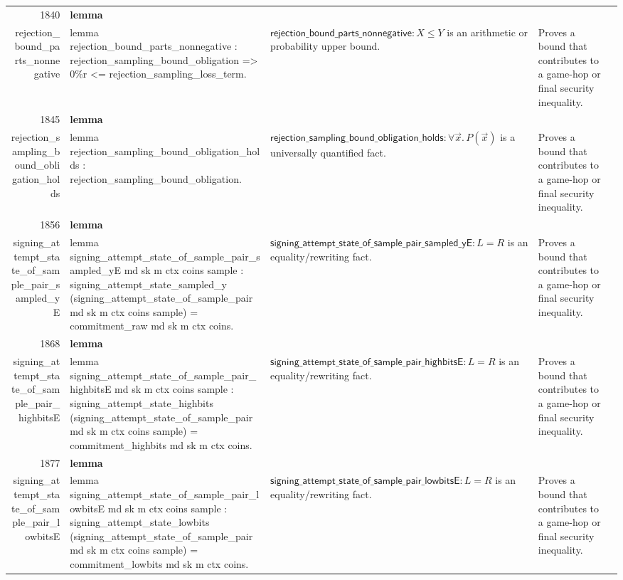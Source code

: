 \documentclass[10pt]{article}
\newcommand{\ec}[1]{\begingroup\ttfamily\scriptsize #1\endgroup}
\begin{document}
\begin{longtable}{r L{0.17\textwidth} L{0.26\textwidth} L{0.27\textwidth} L{0.20\textwidth}}
1840 & \textbf{lemma}\\\ec{rejection\_bound\_parts\_nonnegative} & \ec{lemma rejection\_bound\_parts\_nonnegative : rejection\_sampling\_bound\_obligation => 0\%r <= rejection\_sampling\_loss\_term.} & \(\mathsf{rejection\_bound\_parts\_nonnegative} : X \le Y\) is an arithmetic or probability upper bound. & Proves a bound that contributes to a game-hop or final security inequality. \\
1845 & \textbf{lemma}\\\ec{rejection\_sampling\_bound\_obligation\_holds} & \ec{lemma rejection\_sampling\_bound\_obligation\_holds : rejection\_sampling\_bound\_obligation.} & \(\mathsf{rejection\_sampling\_bound\_obligation\_holds} : \forall \vec{x}.\, P(\vec{x})\) is a universally quantified fact. & Proves a bound that contributes to a game-hop or final security inequality. \\
1856 & \textbf{lemma}\\\ec{signing\_attempt\_state\_of\_sample\_pair\_sampled\_yE} & \ec{lemma signing\_attempt\_state\_of\_sample\_pair\_sampled\_yE md sk m ctx coins sample : signing\_attempt\_state\_sampled\_y (signing\_attempt\_state\_of\_sample\_pair md sk m ctx coins sample) = commitment\_raw md sk m ctx coins.} & \(\mathsf{signing\_attempt\_state\_of\_sample\_pair\_sampled\_yE} : L = R\) is an equality/rewriting fact. & Proves a bound that contributes to a game-hop or final security inequality. \\
1868 & \textbf{lemma}\\\ec{signing\_attempt\_state\_of\_sample\_pair\_highbitsE} & \ec{lemma signing\_attempt\_state\_of\_sample\_pair\_highbitsE md sk m ctx coins sample : signing\_attempt\_state\_highbits (signing\_attempt\_state\_of\_sample\_pair md sk m ctx coins sample) = commitment\_highbits md sk m ctx coins.} & \(\mathsf{signing\_attempt\_state\_of\_sample\_pair\_highbitsE} : L = R\) is an equality/rewriting fact. & Proves a bound that contributes to a game-hop or final security inequality. \\
1877 & \textbf{lemma}\\\ec{signing\_attempt\_state\_of\_sample\_pair\_lowbitsE} & \ec{lemma signing\_attempt\_state\_of\_sample\_pair\_lowbitsE md sk m ctx coins sample : signing\_attempt\_state\_lowbits (signing\_attempt\_state\_of\_sample\_pair md sk m ctx coins sample) = commitment\_lowbits md sk m ctx coins.} & \(\mathsf{signing\_attempt\_state\_of\_sample\_pair\_lowbitsE} : L = R\) is an equality/rewriting fact. & Proves a bound that contributes to a game-hop or final security inequality. \\

\end{longtable}
\end{document}

